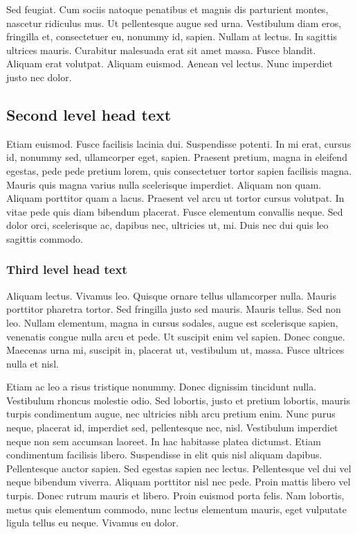 \documentclass[AMS,STIX2COL]{WileyNJD-v2}
\begin{document}
    Sed feugiat. Cum sociis natoque penatibus et magnis dis parturient montes, nascetur ridiculus mus. Ut pellentesque
    augue sed urna. Vestibulum diam eros, fringilla et, consectetuer eu, nonummy id, sapien. Nullam at lectus. In sagittis
    ultrices mauris. Curabitur malesuada erat sit amet massa. Fusce blandit. Aliquam erat volutpat. Aliquam euismod.
    Aenean vel lectus. Nunc imperdiet justo nec dolor.

    \subsection{Second level head text}

    Etiam euismod. Fusce facilisis lacinia dui. Suspendisse potenti. In mi erat, cursus id, nonummy sed, ullamcorper
    eget, sapien. Praesent pretium, magna in eleifend egestas, pede pede pretium lorem, quis consectetuer tortor sapien
    facilisis magna. Mauris quis magna varius nulla scelerisque imperdiet. Aliquam non quam. Aliquam porttitor quam
    a lacus. Praesent vel arcu ut tortor cursus volutpat. In vitae pede quis diam bibendum placerat. Fusce elementum
    convallis neque. Sed dolor orci, scelerisque ac, dapibus nec, ultricies ut, mi. Duis nec dui quis leo sagittis commodo.

    \subsubsection{Third level head text}

    Aliquam lectus. Vivamus leo. Quisque ornare tellus ullamcorper nulla. Mauris porttitor pharetra tortor. Sed fringilla
    justo sed mauris. Mauris tellus. Sed non leo. Nullam elementum, magna in cursus sodales, augue est scelerisque
    sapien, venenatis congue nulla arcu et pede. Ut suscipit enim vel sapien. Donec congue. Maecenas urna mi, suscipit
    in, placerat ut, vestibulum ut, massa. Fusce ultrices nulla et nisl.

    Etiam ac leo a risus tristique nonummy. Donec dignissim tincidunt nulla. Vestibulum rhoncus molestie odio. Sed
    lobortis, justo et pretium lobortis, mauris turpis condimentum augue, nec ultricies nibh arcu pretium enim. Nunc
    purus neque, placerat id, imperdiet sed, pellentesque nec, nisl. Vestibulum imperdiet neque non sem accumsan laoreet.
    In hac habitasse platea dictumst. Etiam condimentum facilisis libero. Suspendisse in elit quis nisl aliquam dapibus.
    Pellentesque auctor sapien. Sed egestas sapien nec lectus. Pellentesque vel dui vel neque bibendum viverra. Aliquam
    porttitor nisl nec pede. Proin mattis libero vel turpis. Donec rutrum mauris et libero. Proin euismod porta felis.
    Nam lobortis, metus quis elementum commodo, nunc lectus elementum mauris, eget vulputate ligula tellus eu neque.
    Vivamus eu dolor.
\end{document}

